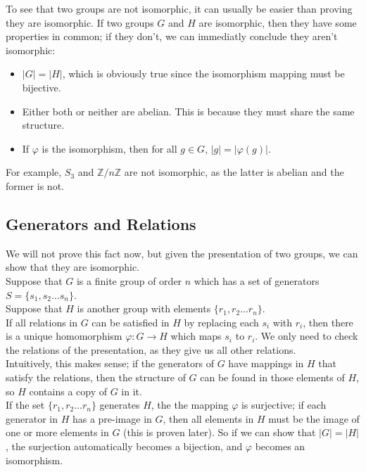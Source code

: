 \documentclass[12pt]{article}
\newcommand{\Z}{\mathbb{Z}}
\begin{document}
    To see that two groups are not isomorphic,
    it can usually be easier than proving they are isomorphic.
    If two groups $G$ and $H$ are isomorphic,
    then they have some properties in common;
    if they don't, we can immediatly conclude they aren't isomorphic:
    \begin{itemize}[label=$\diamond$]
        \item 
            $|G| = |H|$,
            which is obviously true since the isomorphism mapping
            must be bijective.
        \item 
            Either both or neither are abelian.
            This is because they must share the same structure.
        \item 
            If $\varphi$ is the isomorphism,
            then for all $g \in G$,
            $|g| = |\varphi(g)|$.
    \end{itemize} 
    For example, $S_3$ and $\Z/n\Z$ are not isomorphic,
    as the latter is abelian and the former is not. \\


    \subsection*{Generators and Relations}

    We will not prove this fact now,
    but given the presentation of two groups,
    we can show that they are isomorphic. \\
    Suppose that $G$ is a finite group of order $n$
    which has a set of generators $S = \{ s_1, s_2 \dots s_n \}$. \\
    Suppose that $H$ is another group
    with elements $\{ r_1, r_2 \dots r_n\}$. \\
    If all relations in $G$ can be satisfied in $H$
    by replacing each $s_i$ with $r_i$,
    then there is a unique homomorphism $\varphi: G \to H$
    which maps $s_i$ to $r_i$.
    We only need to check the relations of the presentation,
    as they give us all other relations. \\
    Intuitively, this makes sense;
    if the generators of $G$ have mappings in $H$
    that satisfy the relations,
    then the structure of $G$ can be found
    in those elements of $H$,
    so $H$ contains a copy of $G$ in it. \\
    If the set $\{ r_1, r_2 \dots r_n\}$ generates $H$,
    the the mapping $\varphi$ is surjective;
    if each generator in $H$ has a pre-image in $G$,
    then all elements in $H$ must be the image of one or more
    elements in $G$ (this is proven later). 
    So if we can show that $|G| = |H|$,
    the surjection automatically becomes a bijection,
    and $\varphi$ becomes an isomorphism. \\
\end{document}
